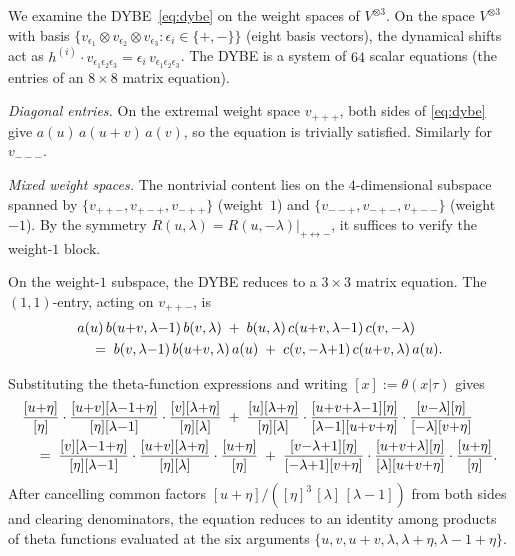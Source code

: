 \begin{computation}
\label{comp:dybe-matrix-entries}
We examine the DYBE~\eqref{eq:dybe} on the weight spaces of
$V^{\otimes 3}$.  On the space $V^{\otimes 3}$
with basis $\{v_{\epsilon_1} \otimes v_{\epsilon_2}
\otimes v_{\epsilon_3} : \epsilon_i \in \{+,-\}\}$
(eight basis vectors), the dynamical shifts act as
$h^{(i)} \cdot v_{\epsilon_1\epsilon_2\epsilon_3}
= \epsilon_i\,v_{\epsilon_1\epsilon_2\epsilon_3}$.
The DYBE is a system of $64$ scalar equations (the entries of
an $8 \times 8$ matrix equation).

\emph{Diagonal entries.}
On the extremal weight space $v_{+++}$, both sides of
\eqref{eq:dybe} give
$a(u)\,a(u{+}v)\,a(v)$, so the equation is trivially satisfied.
Similarly for $v_{---}$.

\emph{Mixed weight spaces.}
The nontrivial content lies on the $4$-dimensional subspace
spanned by $\{v_{++-}, v_{+-+}, v_{-++}\}$ (weight~$1$)
and $\{v_{--+}, v_{-+-}, v_{+--}\}$ (weight~$-1$).
By the symmetry $R(u,\lambda) = R(u,-\lambda)|_{+\leftrightarrow -}$,
it suffices to verify the weight-$1$ block.

On the weight-$1$ subspace, the DYBE
reduces to a $3 \times 3$ matrix equation.
The $(1,1)$-entry, acting on $v_{++-}$, is
\begin{align}\label{eq:dybe-11}
&a(u)\,b(u{+}v, \lambda{-}1)\,b(v,\lambda) \;+\;
b(u,\lambda)\,c(u{+}v, \lambda{-}1)\,c(v,-\lambda) \notag \\
&\quad =\;
b(v,\lambda{-}1)\,b(u{+}v,\lambda)\,a(u) \;+\;
c(v,{-}\lambda{+}1)\,c(u{+}v,\lambda)\,a(u).
\end{align}

Substituting the theta-function expressions and writing
$[x] := \theta(x|\tau)$ gives
\begin{align}\label{eq:dybe-11-theta}
&\frac{[u{+}\eta]}{[\eta]}\cdot
\frac{[u{+}v][\lambda{-}1{+}\eta]}{[\eta][\lambda{-}1]}
\cdot
\frac{[v][\lambda{+}\eta]}{[\eta][\lambda]}
\;+\;
\frac{[u][\lambda{+}\eta]}{[\eta][\lambda]}
\cdot
\frac{[u{+}v{+}\lambda{-}1][\eta]}{[\lambda{-}1][u{+}v{+}\eta]}
\cdot
\frac{[v{-}\lambda][\eta]}{[-\lambda][v{+}\eta]} \notag \\
&\quad =\;
\frac{[v][\lambda{-}1{+}\eta]}{[\eta][\lambda{-}1]}
\cdot
\frac{[u{+}v][\lambda{+}\eta]}{[\eta][\lambda]}
\cdot
\frac{[u{+}\eta]}{[\eta]} \;+\;
\frac{[v{-}\lambda{+}1][\eta]}{[-\lambda{+}1][v{+}\eta]}
\cdot
\frac{[u{+}v{+}\lambda][\eta]}{[\lambda][u{+}v{+}\eta]}
\cdot
\frac{[u{+}\eta]}{[\eta]}.
\end{align}
After cancelling common factors $[u{+}\eta]/([\eta]^3\,[\lambda]\,
[\lambda{-}1])$ from both sides and clearing denominators, the
equation reduces to an identity among products of theta functions
evaluated at the six arguments $\{u, v, u{+}v, \lambda,
\lambda{+}\eta, \lambda{-}1{+}\eta\}$.
\end{computation}

